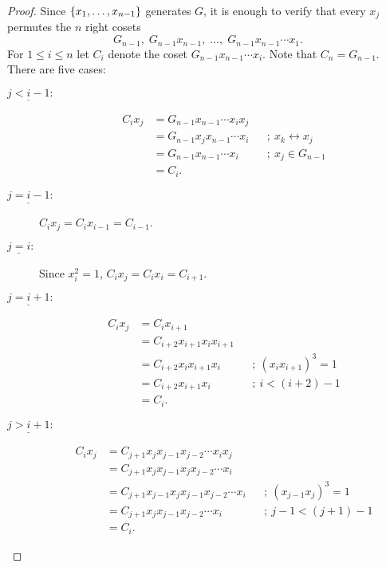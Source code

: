 \begin{proof}
Since $\{x_1,\dots,x_{n-1}\}$ generates $G$, it is enough to verify that every $x_j$ permutes the $n$ right cosets
$$
    G_{n-1},\; G_{n-1}x_{n-1},\;\dots,\;G_{n-1}x_{n-1}\cdots x_1.
$$
For $1\le i\le n$ let $C_i$ denote the coset $G_{n-1}x_{n-1}\cdots x_i$. Note that $C_n=G_{n-1}$. There are five cases:
\begin{description}%
    \item[$\underline{j<i-1}:$]
        \begin{align*}
            C_ix_j &= G_{n-1}x_{n-1}\cdots x_ix_j\\
                &= G_{n-1}x_jx_{n-1}\cdots x_i
                    &&;\ x_k\leftrightarrow x_j\\
                &= G_{n-1}x_{n-1}\cdots x_i
                    &&;\ x_j\in G_{n-1}\\
                &= C_i.
        \end{align*}
    \item[$\underline{j=i-1}:$] $C_ix_j=C_ix_{i-1}=C_{i-1}$.
    \item[$\underline{j=i}:$] Since $x_i^2=1$, $C_ix_j=C_ix_i=C_{i+1}$.
    \item[$\underline{j=i+1}:$]
        \begin{align*}
            C_ix_j &= C_ix_{i+1}\\
                &= C_{i+2}x_{i+1}x_ix_{i+1}\\
                &= C_{i+2}x_ix_{i+1}x_i
                    &&;\ (x_ix_{i+1})^3=1\\
                &= C_{i+2}x_{i+1}x_i
                    &&;\ i<(i+2)-1\\
                &= C_i.
        \end{align*}
    \item[$\underline{j>i+1}:$]
        \begin{align*}
            C_ix_j &= C_{j+1}x_jx_{j-1}x_{j-2}\cdots x_ix_j\\
                &= C_{j+1}x_jx_{j-1}x_jx_{j-2}\cdots x_i\\
                &= C_{j+1}x_{j-1}x_jx_{j-1}x_{j-2}\cdots x_i
                    &&;\ (x_{j-1}x_j)^3=1\\
                &= C_{j+1}x_jx_{j-1}x_{j-2}\cdots x_i
                    &&;\ j-1 < (j+1) -1\\
                &= C_i.
        \end{align*}
\end{description}


\end{proof}
